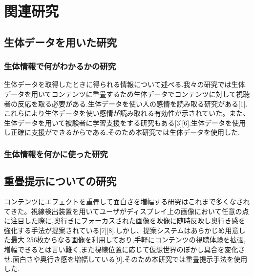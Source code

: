 \thispagestyle{myheadings}
\chapter{関連研究}


\section{生体データを用いた研究}

\subsection{生体情報で何がわかるかの研究}
生体データを取得したときに得られる情報について述べる.我々の研究では生体データを用いてコンテンツに重畳するため生体データでコンテンツに対して視聴者の反応を取る必要がある.生体データを使い人の感情を読み取る研究がある[1].これらにより生体データを使い感情が読み取れる有効性が示されていた。また、生体データを用いて被験者に学習支援をする研究もある[3][6].生体データを使用し正確に支援ができるからである.そのため本研究では生体データを使用した.
\subsection{生体情報を何かに使った研究}


\section{重畳提示についての研究}
コンテンツにエフェクトを重畳して面白さを増幅する研究はこれまで多くなされてきた。視線検出装置を用いてユーザがディスプレイ上の画像において任意の点に注目した際に,奥行きにフォーカスされた画像を映像に随時反映し奥行き感を強化する手法が提案されている[7][8].しかし、提案システムはあらかじめ用意した最大 256枚からなる画像を利用しており,手軽にコンテンツの視聴体験を拡張,増幅できるとは言い難く,また視線位置に応じて仮想世界のぼかし具合を変化させ,面白さや奥行き感を増幅している[9].そのため本研究では重畳提示手法を使用した.

